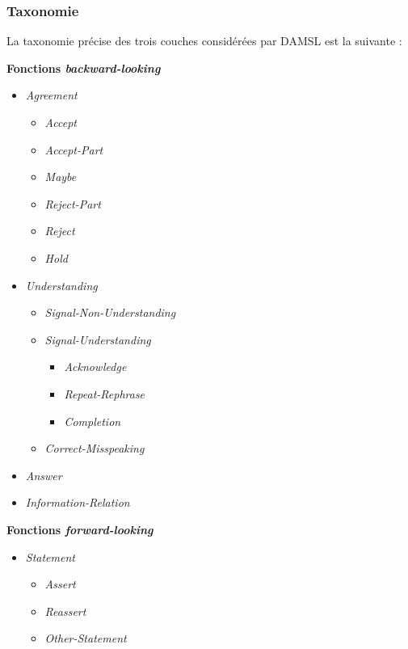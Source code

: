 \documentclass[10pt,a4paper,twoside]{article}
\begin{document}
\subsubsection{Taxonomie}

La taxonomie précise des trois couches considérées par DAMSL est la suivante :

\begin{center}
\noindent\parbox[t]{2.2in}{\raggedright%
\textbf{Fonctions \textit{backward-looking}}
\begin{itemize}[topsep=0pt,itemsep=-2pt,leftmargin=15pt]
	\item \textit{Agreement }
	\begin{itemize}
		\item \textit{Accept}
		\item \textit{Accept-Part}
		\item \textit{Maybe}
		\item \textit{Reject-Part}
		\item \textit{Reject}
		\item \textit{Hold}
	\end{itemize}
	\item \textit{Understanding}
	\begin{itemize}
		\item \textit{Signal-Non-Understanding}
		\item \textit{Signal-Understanding}
		\begin{itemize}
			\item \textit{Acknowledge}
			\item \textit{Repeat-Rephrase}
			\item \textit{Completion}
		\end{itemize}
		\item \textit{Correct-Misspeaking}
	\end{itemize}
	\item \textit{Answer}
	\item \textit{Information-Relation}
\end{itemize}
}%
\parbox[t]{2.2in}{\raggedright%
\textbf{Fonctions \textit{forward-looking}}
\begin{itemize}[topsep=0pt,itemsep=-2pt,leftmargin=15pt]
	\item \textit{Statement}
	\begin{itemize}
		\item \textit{Assert}
		\item \textit{Reassert}
		\item \textit{Other-Statement}
	\end{itemize}

\end{itemize}}
\end{center}
\end{document}
